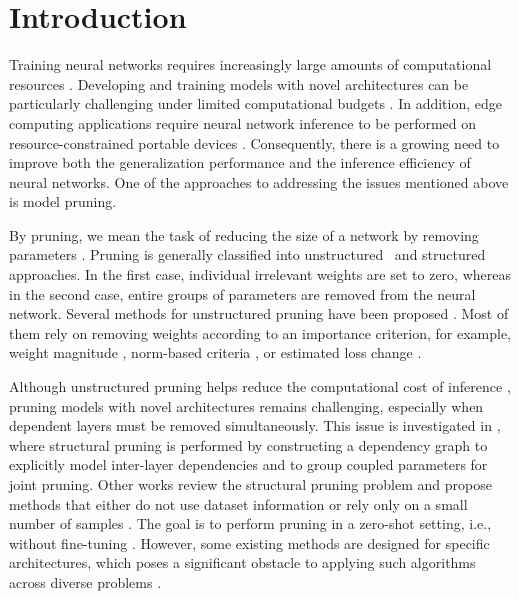 \documentclass[runningheads]{llncs}
\begin{document}
\section{Introduction}
Training neural networks requires increasingly large amounts of computational resources \cite{Sevilla2022}. Developing and training models with novel architectures can be particularly challenging under limited computational budgets \cite{Tan2019}. In addition, edge computing applications require neural network inference to be performed on resource-constrained portable devices \cite{BanjanovicMehmedovic2023}. Consequently, there is a growing need to improve both the generalization performance and the inference efficiency of neural networks. One of the approaches to addressing the issues mentioned above is model pruning.

By pruning, we mean the task of reducing the size of a network by removing parameters \cite{Liang2021}. Pruning is generally classified into unstructured~\cite{Liu2021,Wang2020} and structured~\cite{You2019,Ma2023} approaches. In the first case, individual irrelevant weights are set to zero, whereas in the second case, entire groups of parameters are removed from the neural network. Several methods for unstructured pruning have been proposed \cite{inproceedings,Hassibi1992,zeng2019mlprune,Han2015}. Most of them rely on removing weights according to an importance criterion, for example, weight magnitude \cite{Han2015,Lubana2020}, norm-based criteria \cite{He2018}, or estimated loss change \cite{Molchanov2016,Hassibi1992}.

Although unstructured pruning helps reduce the computational cost of inference \cite{Han2015}, pruning models with novel architectures remains challenging, especially when dependent layers must be removed simultaneously. This issue is investigated in \cite{Fang2023}, where structural pruning is performed by constructing a dependency graph to explicitly model inter-layer dependencies and to group coupled parameters for joint pruning. Other works review the structural pruning problem and propose methods that either do not use dataset information \cite{Tanaka2020,Yvinec2021} or rely only on a small number of samples \cite{Tanaka2020,He2022}. The goal is to perform pruning in a zero-shot setting, i.e., without fine-tuning \cite{Chen2021,Liu2022}. However, some existing methods are designed for specific architectures, which poses a significant obstacle to applying such algorithms across diverse problems \cite{Frantar2023,Wang2019}.
\end{document}
